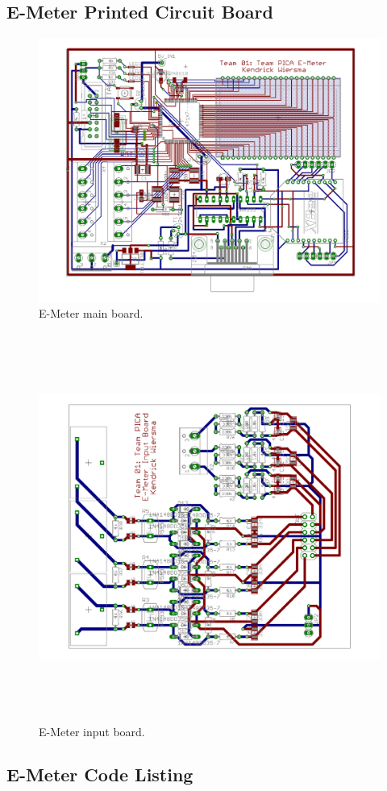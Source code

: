 \subsection{E-Meter Printed Circuit Board}\label{sec:e_meter_pcb}
\begin{figure}[htbp]
  \centering
  \includegraphics[width=5in, angle=90]{includes/e_meter_main_large}
  \caption{E-Meter main board.}
  \label{fig:e_meter_main_board_large}
\end{figure}
\begin{figure}[htbp]
  \centering
  \includegraphics[height=5in, angle=90]{includes/e_meter_input_board_large}
  \caption{E-Meter input board.}
  \label{fig:e_meter_input_board_large}
\end{figure}
\clearpage

\subsection{E-Meter Code Listing}
